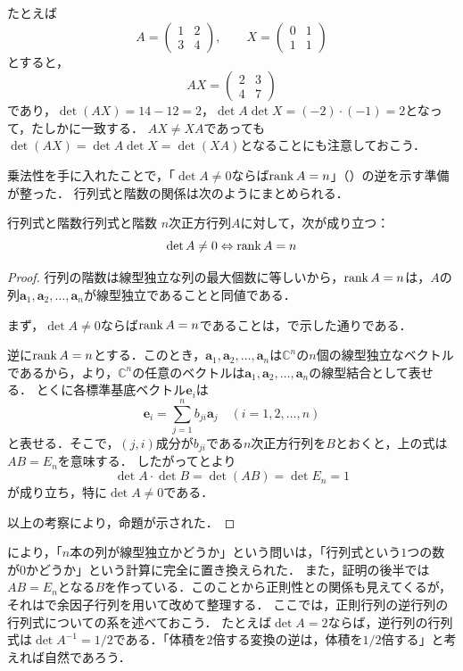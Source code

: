 たとえば
\[
  A = \begin{pmatrix} 1 & 2 \\ 3 & 4 \end{pmatrix}, \qquad
  X = \begin{pmatrix} 0 & 1 \\ 1 & 1 \end{pmatrix}
\]
とすると，
\[
  AX = \begin{pmatrix} 2 & 3 \\ 4 & 7 \end{pmatrix}
\]
であり，$\det(AX) = 14 - 12 = 2$，$\det A \det X = (-2) \cdot (-1) = 2$となって，たしかに一致する．
$AX \ne XA$であっても$\det(AX) = \det A \det X = \det(XA)$となることにも注意しておこう．

乗法性を手に入れたことで，「$\det A \ne 0$ならば$\operatorname{rank} A = n$」（）の逆を示す準備が整った．
行列式と階数の関係は次のようにまとめられる．


\begin{prop}{行列式と階数}{行列式と階数}
  $n$次正方行列$A$に対して，次が成り立つ：
  \[
  \det A \ne 0 \mathrel{\Leftrightarrow} \operatorname{rank} A = n
  \]
\end{prop}

\begin{tleftbar}
\begin{proof}
  行列の階数は線型独立な列の最大個数に等しいから，$\operatorname{rank} A = n$は，$A$の列$\bm{a}_1, \bm{a}_2, \dots, \bm{a}_n$が線型独立であることと同値である．

  まず，$\det A \ne 0$ならば$\operatorname{rank} A = n$であることは，で示した通りである．

  逆に$\operatorname{rank} A = n$とする．このとき，$\bm{a}_1, \bm{a}_2, \dots, \bm{a}_n$は$\mathbb{C}^n$の$n$個の線型独立なベクトルであるから，より，$\mathbb{C}^n$の任意のベクトルは$\bm{a}_1, \bm{a}_2, \dots, \bm{a}_n$の線型結合として表せる．
  とくに各標準基底ベクトル$\bm{e}_i$は
  \[
  \bm{e}_i = \sum_{j=1}^{n} b_{ji} \bm{a}_j \quad (i = 1, 2, \dots, n)
  \]
  と表せる．そこで，$(j, i)$成分が$b_{ji}$である$n$次正方行列を$B$とおくと，上の式は$AB = E_n$を意味する．
  したがってとより
  \[
  \det A \cdot \det B = \det(AB) = \det E_n = 1
  \]
  が成り立ち，特に$\det A \ne 0$である．

  以上の考察により，命題が示された．
\end{proof}
\end{tleftbar}

により，「$n$本の列が線型独立かどうか」という問いは，「行列式という$1$つの数が$0$かどうか」という計算に完全に置き換えられた．
また，証明の後半では$AB = E_n$となる$B$を作っている．このことから正則性との関係も見えてくるが，それはで余因子行列を用いて改めて整理する．
ここでは，正則行列の逆行列の行列式についての系を述べておこう．
たとえば$\det A = 2$ならば，逆行列の行列式は$\det A^{-1} = 1/2$である．「体積を$2$倍する変換の逆は，体積を$1/2$倍する」と考えれば自然であろう．

